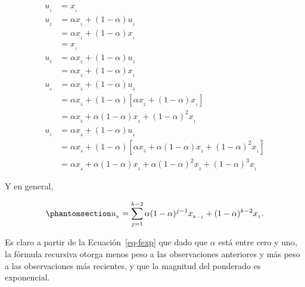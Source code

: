 \documentclass[
  us-letterpaper,
]{scrreprt}
\theoremstyle{definition}
\theoremstyle{plain}
\theoremstyle{plain}
\theoremstyle{definition}
\theoremstyle{remark}
\begin{document}
\[
\begin{split}
u_{_1} &= x_{_1}\\
u_{_2} &= \alpha x_{_1}+(1-\alpha)u_{_1}\\ &=\alpha x_{_1}+(1-\alpha)x_{_1}\\ &=x_{_1}\\
u_{_3} &= \alpha x_{_2}+(1-\alpha)u_{_2}\\ &=\alpha x_{_2}+(1-\alpha)x_{_1}\\
u_{_4} &= \alpha x_{_3}+(1-\alpha)u_{_3}\\ &=\alpha x_{_3}+(1-\alpha)[\alpha x_{_2}+(1-\alpha)x_{_1}]\\ &=\alpha x_{_3} + \alpha(1-\alpha)x_{_2}+(1-\alpha)^2x_{_1}\\
u_{_5} &= \alpha x_{_4}+(1-\alpha)u_{_4}\\ &=\alpha x_{_4}+(1-\alpha)[\alpha x_{_3}+\alpha(1-\alpha)x_{_2}+(1-\alpha)^2x_{_1}]\\ &=\alpha x_{_4} + \alpha(1-\alpha)x_{_3}+\alpha(1-\alpha)^2 x_{_2}+(1-\alpha)^3x_{_1}
\end{split}
\]

Y en general,

\begin{equation}\phantomsection\label{eq-fexp}{
u_{_k}=\sum_{j=1}^{k-2}\alpha(1-\alpha)^{j-1}x_{_{k-j}}+(1-\alpha)^{k-2}x_{_1}.
}\end{equation}

Es claro a partir de la Ecuación~\ref{eq-fexp} que dado que \(\alpha\)
está entre cero y uno, la fórmula recursiva otorga menos peso a las
observaciones anteriores y más peso a las observaciones más recientes, y
que la magnitud del ponderado es exponencial.
\end{document}
